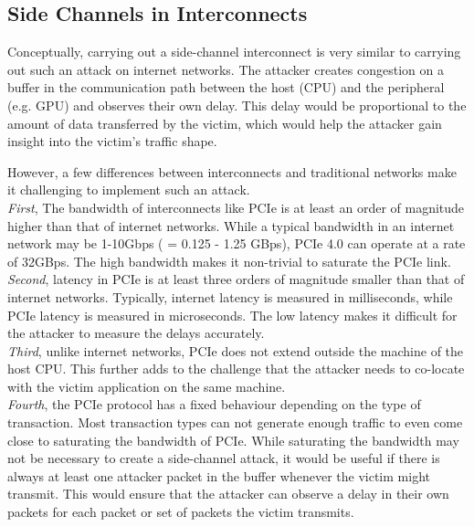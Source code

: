 \subsection{Side Channels in Interconnects}
\label{subsec:interconnect-sc-background-side-channels}

Conceptually, carrying out a side-channel interconnect is very similar to carrying out such an attack on internet networks. 
The attacker creates congestion on a buffer in the communication path between the host (CPU) and the peripheral (e.g. GPU) and observes their own delay.
This delay would be proportional to the amount of data transferred by the victim, which would help the attacker gain insight into the victim's traffic shape.

However, a few differences between interconnects and traditional networks make it challenging to implement such an attack. \\
\textit{First}, The bandwidth of interconnects like PCIe is at least an order of magnitude higher than that of internet networks.
While a typical bandwidth in an internet network may be 1-10Gbps ( = 0.125 - 1.25 GBps), PCIe 4.0 can operate at a rate of 32GBps.
The high bandwidth makes it non-trivial to saturate the PCIe link. \\
\textit{Second}, latency in PCIe is at least three orders of magnitude smaller than that of internet networks.
Typically, internet latency is measured in milliseconds, while PCIe latency is measured in microseconds.
The low latency makes it difficult for the attacker to measure the delays accurately. \\
\textit{Third}, unlike internet networks, PCIe does not extend outside the machine of the host CPU.
This further adds to the challenge that the attacker needs to co-locate with the victim application on the same machine. \\
\textit{Fourth}, the PCIe protocol has a fixed behaviour depending on the type of transaction. 
Most transaction types can not generate enough traffic to even come close to saturating the bandwidth of PCIe. 
While saturating the bandwidth may not be necessary to create a side-channel attack, it would be useful if there is always at least one attacker packet in the buffer whenever the victim might transmit.
This would ensure that the attacker can observe a delay in their own packets for each packet or set of packets the victim transmits.


\endinput




https://www.linkedin.com/pulse/pci-express-primer-3-transaction-layer-simon-southwell/